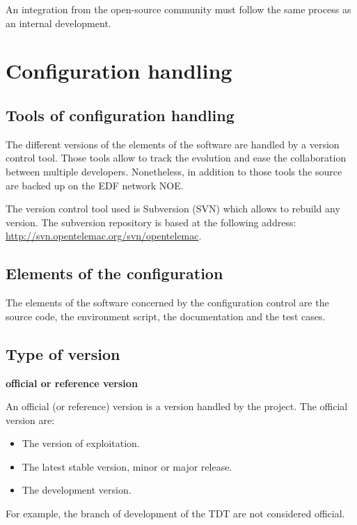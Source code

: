 An integration from the open-source community must follow the same process as
an internal development.

\section{Configuration handling}
\label{conf}

\subsection{Tools of configuration handling}

The different versions of the elements of the \telemacsystem{} software are
handled by a version control tool. Those tools allow to track the evolution and
ease the collaboration between multiple developers. Nonetheless, in addition to
those tools the source are backed up on the EDF network NOE\@.

The version control tool used is Subversion (SVN) which allows to rebuild any
version. The subversion repository is based at the following address:
\url{http://svn.opentelemac.org/svn/opentelemac}.

\subsection{Elements of the configuration}

The elements of the \telemacsystem{} software concerned by the configuration
control are the source code, the environment script, the documentation and the
test cases.

\subsection{Type of version}

\textbf{\telemacsystem{} official or reference version}

An official (or reference) version is a version handled by the \telemacsystem{}
project. The official version are:
\begin{itemize}
\item The version of exploitation.
\item The latest stable version, minor or major release.
\item The development version.
\end{itemize}

For example, the branch of development of the TDT are not considered
official.

